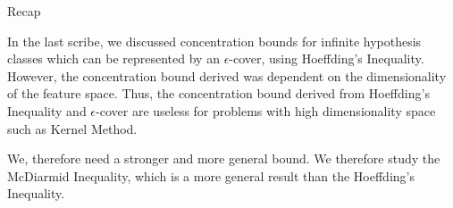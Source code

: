 \documentclass[11pt,a4paper]{article}
\begin{document}
\makeheader

\begin{ssection}{Recap}
	
	In the last scribe, we discussed concentration bounds for infinite hypothesis classes which can be represented by an $\epsilon$-cover, using Hoeffding's Inequality. However, the concentration bound derived was dependent on the dimensionality of the feature space. Thus, the concentration bound derived from Hoeffding's Inequality and $\epsilon$-cover are useless for problems with high dimensionality space such as Kernel Method.
	
	We, therefore need a stronger and more general bound. We therefore study the McDiarmid Inequality, which is a more general result than the Hoeffding's Inequality.
	
\end{ssection}
\end{document}
